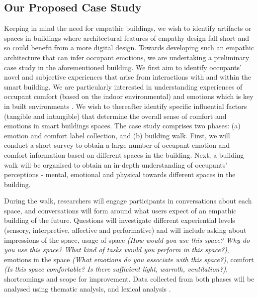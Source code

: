 \documentclass [sigconf, review, anonymous] {acmart}
\begin{document}
\subsection{Our Proposed Case Study} 
Keeping in mind the need for empathic buildings, we wish to identify artifacts or spaces in buildings where architectural features of empathy design fall short and so could benefit from a more digital design. Towards developing such an empathic architecture that can infer occupant emotions, we are undertaking a preliminary case study in the aforementioned building. We first aim to identify occupants' novel and subjective experiences that arise from interactions with and within the smart building. We are particularly interested in understanding experiences of occupant comfort (based on the indoor environmental) and emotions which is key in built environments \cite{alavi2017comfort}.  We wish to thereafter identify specific influential factors (tangible and intangible) that determine the overall sense of comfort and emotions in smart buildings spaces. The case study comprises two phases: (a) emotion and comfort label collection, and (b) building walk. First, we will conduct a short survey to obtain a large number of occupant emotion and comfort information based on different spaces in the building. Next, a building walk will be organised to obtain an in-depth understanding of occupants' perceptions - mental, emotional and physical towards different spaces in the building.

During the walk, researchers will engage participants in conversations about each space, and conversations will form around what users expect of an empathic building of the future. Questions will investigate different experiential levels (sensory, interpretive, affective and performative) and will include asking about impressions of the space, usage of space \textit{(How would you use this space? Why do you use this space? What kind of tasks would you perform in this space?)}, emotions in the space \textit{(What emotions do you associate with this space?)}, comfort \textit{(Is this space comfortable? Is there sufficient light, warmth, ventilation?)}, shortcomings and scope for improvement. Data collected from both phases will be analysed using thematic analysis, and lexical analysis \cite{braun2006using, xue2020mood}. 

\end{document}
